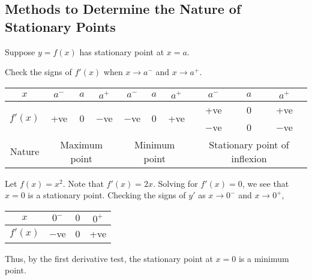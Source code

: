 \subsection{Methods to Determine the Nature of Stationary Points}

Suppose $y = f(x)$ has stationary point at $x = a$.

\begin{recipe}
    Check the signs of $f'(x)$ when $x \to a^-$ and $x \to a^+$.
    \begin{table}[H]
        \centering
        \begin{tabular}{|c|ccc|ccc|ccc|}
            \hline
            $x$ & $a^-$ & $a$ & $a^+$ & $a^-$ & $a$ & $a^+$ & \hspace{1.5em} $a^-$ & \hspace{1em} $a$ & $a^+$ \\ \hline
            \multirow{2}{*}{$f'(x)$} & \multirow{2}{*}{+ve} & \multirow{2}{*}{0} & \multirow{2}{*}{$-$ve} & \multirow{2}{*}{$-$ve} & \multirow{2}{*}{0} & \multirow{2}{*}{+ve} & \hspace{1.5em} +ve & \hspace{1em} 0 & +ve \\ 
             & & & & & & & \hspace{1.5em} $-$ve & \hspace{1em} 0 & $-$ve \\ \hline
            Nature & \multicolumn{3}{c|}{Maximum point} & \multicolumn{3}{c|}{Minimum point} & \multicolumn{3}{c|}{Stationary point of inflexion}\\ \hline
        \end{tabular}
      \end{table}
\end{recipe}

\begin{example}
    Let $f(x) = x^2$. Note that $f'(x) = 2x$. Solving for $f'(x) = 0$, we see that $x = 0$ is a stationary point. Checking the signs of $y'$ as $x \to 0^-$ and $x \to 0^+$,
    \begin{table}[H]
        \centering
        \begin{tabular}{|c|c|c|c|}
        \hline
        $x$ & $0^-$ & $0$ & $0^+$ \\ \hline
        $f'(x)$ & $-$ve & 0 & +ve \\ \hline
        \end{tabular}
    \end{table}
    Thus, by the first derivative test, the stationary point at $x = 0$ is a minimum point.
\end{example}

